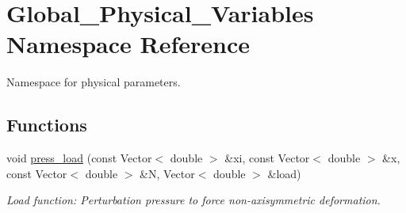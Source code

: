 \hypertarget{namespaceGlobal__Physical__Variables}{}\section{Global\+\_\+\+Physical\+\_\+\+Variables Namespace Reference}
\label{namespaceGlobal__Physical__Variables}


Namespace for physical parameters.  


\subsection*{Functions}
\begin{DoxyCompactItemize}
\item 
void \hyperlink{namespaceGlobal__Physical__Variables_a86fd8f502cb8c4c7939ffae742f023eb}{press\+\_\+load} (const Vector$<$ double $>$ \&xi, const Vector$<$ double $>$ \&x, const Vector$<$ double $>$ \&N, Vector$<$ double $>$ \&load)
\begin{DoxyCompactList}\small\item\em Load function\+: Perturbation pressure to force non-\/axisymmetric deformation. \end{DoxyCompactList}\end{DoxyCompactItemize}

